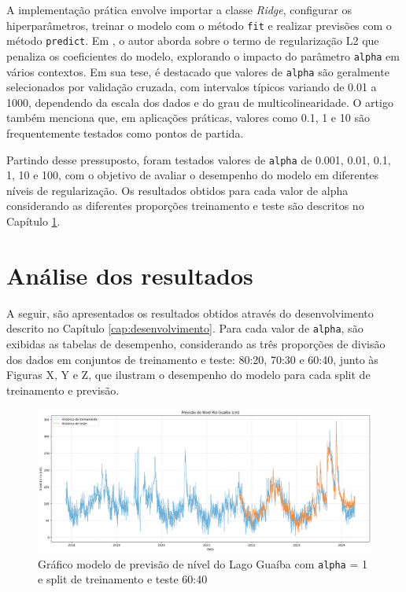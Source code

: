 A implementação prática envolve importar a classe \textit{Ridge}, configurar os hiperparâmetros, treinar o modelo com o método \texttt{fit} e realizar previsões com o método \texttt{predict}. Em \cite{Hastie01102020}, o autor aborda sobre o termo de regularização L2 que penaliza os coeficientes do modelo, explorando o impacto do parâmetro \texttt{alpha} em vários contextos. Em sua tese, é destacado que valores de \texttt{alpha} são geralmente selecionados por validação cruzada, com intervalos típicos variando de 0.01 a 1000, dependendo da escala dos dados e do grau de multicolinearidade. O artigo também menciona que, em aplicações práticas, valores como 0.1, 1 e 10 são frequentemente testados como pontos de partida.

Partindo desse pressuposto, foram testados valores de \texttt{alpha} de 0.001, 0.01, 0.1, 1, 10 e 100, com o objetivo de avaliar o desempenho do modelo em diferentes níveis de regularização.  Os resultados obtidos para cada valor de alpha considerando as diferentes proporções treinamento e teste são descritos no Capítulo \ref{cap:analise_dos_resultados}.

\chapter{Análise dos resultados}
\label{cap:analise_dos_resultados}


A seguir, são apresentados os resultados obtidos através do desenvolvimento descrito no Capítulo \ref{cap:desenvolvimento}. Para cada valor de \texttt{alpha}, são exibidas as tabelas de desempenho, considerando as três proporções de divisão dos dados em conjuntos de treinamento e teste: 80:20, 70:30 e 60:40, junto às Figuras X, Y e Z, que ilustram o desempenho do modelo para cada split de treinamento e previsão.

\begin{figure}[H]
	\caption{\label{fig:comparacao_radiacao_nivel_rio}Gráfico modelo de previsão de nível do Lago Guaíba com \texttt{alpha} = 1 e split de treinamento e teste 60:40}
	\begin{center}
		\includegraphics[scale=0.35]{figuras/modelo_previsao_60_40.png}
	\end{center}
\end{figure}

